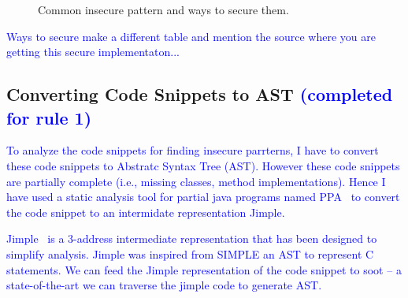 \documentclass[sigconf]{acmart}
\begin{document}
  \begin{figure}[ht]
    \caption{Common insecure pattern and ways to secure them.}
    \label{tab:insecure-pattern}
  \end{figure}
  
\textcolor{blue}{Ways to secure make a different table and mention the source where you are getting this secure implementaton...}
\subsection{Converting Code Snippets to AST \textcolor{blue}{(completed for rule 1)}}
\textcolor{blue}{
To analyze the code snippets for finding insecure parrterns, I have to convert these code snippets to Abstratc Syntax Tree (AST). However these code snippets are partially complete (i.e., missing classes, method implementations). Hence I have used a static analysis tool for partial java programs named PPA~\cite{dagenais2008enabling} to convert the code snippet to an intermidate representation Jimple.}

\textcolor{blue}{
Jimple~\cite{vallee1998jimple} is a 3-address intermediate representation that has been designed to simplify analysis. Jimple was inspired from SIMPLE an AST to represent C statements. 
We can feed the Jimple representation of the code snippet to soot -- a state-of-the-art we can traverse the jimple code to generate AST. 
}
\end{document}
